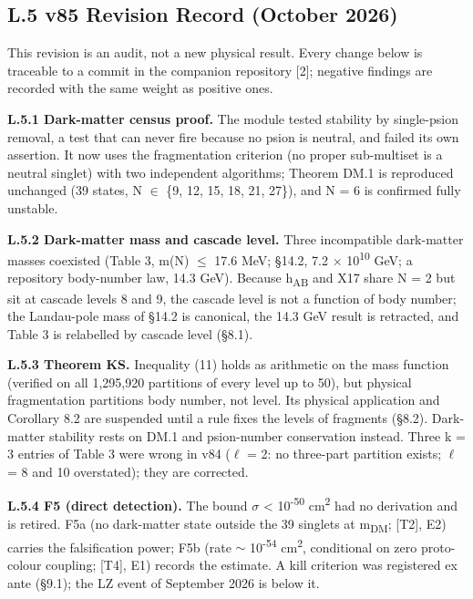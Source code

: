 \documentclass[11pt,letterpaper]{article}
\begin{document}
\clearpage
\subsection*{L.5  v85 Revision Record (October 2026)}

\noindent This revision is an audit, not a new physical result. Every change below is traceable to a commit in the companion repository [2]; negative findings are recorded with the same weight as positive ones.

\noindent \textbf{L.5.1 Dark-matter census proof.} The module  tested stability by single-psion removal, a test that can never fire because no psion is neutral, and failed its own assertion. It now uses the fragmentation criterion (no proper sub-multiset is a neutral singlet) with two independent algorithms; Theorem DM.1 is reproduced unchanged (39 states, N $\in$ \{9, 12, 15, 18, 21, 27\}), and N = 6 is confirmed fully unstable.

\noindent \textbf{L.5.2 Dark-matter mass and cascade level.} Three incompatible dark-matter masses coexisted (Table 3, m(N) $\le$ 17.6 MeV; §14.2, 7.2 $\times$ 10\textsuperscript{10} GeV; a repository body-number law, 14.3 GeV). Because h\textsubscript{AB} and X17 share N = 2 but sit at cascade levels 8 and 9, the cascade level is not a function of body number; the Landau-pole mass of §14.2 is canonical, the 14.3 GeV result is retracted, and Table 3 is relabelled by cascade level (§8.1).

\noindent \textbf{L.5.3 Theorem KS.} Inequality (11) holds as arithmetic on the mass function (verified on all 1,295,920 partitions of every level up to 50), but physical fragmentation partitions body number, not level. Its physical application and Corollary 8.2 are suspended until a rule fixes the levels of fragments (§8.2). Dark-matter stability rests on DM.1 and psion-number conservation instead. Three k = 3 entries of Table 3 were wrong in v84 ($\ell$ = 2: no three-part partition exists; $\ell$ = 8 and 10 overstated); they are corrected.

\noindent \textbf{L.5.4 F5 (direct detection).} The bound $\sigma$ < 10\textsuperscript{-50} cm\textsuperscript{2} had no derivation and is retired. F5a (no dark-matter state outside the 39 singlets at m\textsubscript{DM}; [T2], E2) carries the falsification power; F5b (rate $\sim$ 10\textsuperscript{-54} cm\textsuperscript{2}, conditional on zero proto-colour coupling; [T4], E1) records the estimate. A kill criterion was registered ex ante (§9.1); the LZ event of September 2026 is below it.
\end{document}
